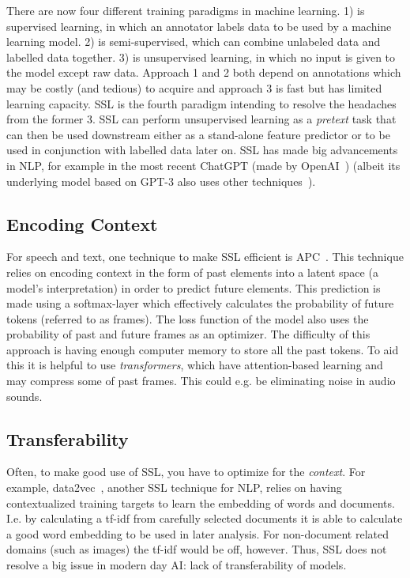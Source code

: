\documentclass[10pt,twocolumn,letterpaper]{article}
\begin{document}
There are now four different training paradigms in machine learning. 1) is supervised learning, in which an annotator labels data to be used by a machine learning model. 2) is semi-supervised, which can combine unlabeled data and labelled data together. 3) is unsupervised learning, in which no input is given to the model except raw data. Approach 1 and 2 both depend on annotations which may be costly (and tedious) to acquire and approach 3 is fast but has limited learning capacity. \gls{SSL} is the fourth paradigm intending to resolve the headaches from the former 3. \gls{SSL} can perform unsupervised learning as a \textit{pretext} task that can then be used downstream either as a stand-alone feature predictor or to be used in conjunction with labelled data later on. \gls{SSL} has made big advancements in \gls{NLP}, for example in the most recent ChatGPT (made by OpenAI~\cite{openAI}) (albeit its underlying model based on GPT-3 also uses other techniques~\cite{gpt3}).

\subsection{Encoding Context}
For speech and text, one technique to make \gls{SSL} efficient is \gls{APC}~\cite{chung2020generative}. This technique relies on encoding context in the form of past elements into a latent space (a model's interpretation) in order to predict future elements. This prediction is made using a softmax-layer which effectively calculates the probability of future tokens (referred to as frames). The loss function of the model also uses the probability of past and future frames as an optimizer. The difficulty of this approach is having enough computer memory to store all the past tokens. To aid this it is helpful to use \textit{transformers}, which have attention-based learning and may compress some of past frames. This could e.g. be eliminating noise in audio sounds.

\subsection{Transferability}
Often, to make good use of \gls{SSL}, you have to optimize for the \textit{context}. For example, data2vec~\cite{data2vec}, another \gls{SSL} technique for \gls{NLP}, relies on having contextualized training targets to learn the embedding of words and documents. I.e. by calculating a \gls{tf-idf} from carefully selected documents it is able to calculate a good word embedding to be used in later analysis. For non-document related domains (such as images) the \gls{tf-idf} would be off, however. Thus, \gls{SSL} does not resolve a big issue in modern day \gls{AI}: lack of transferability of models.
\end{document}
